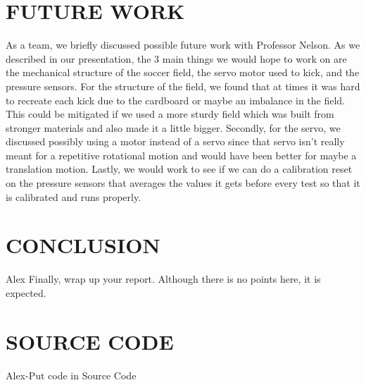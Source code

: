 \documentclass[12pt]{article}
\begin{document}
\section{FUTURE WORK}
As a team, we briefly discussed possible future work with Professor Nelson. As we described in our presentation, the 3 main things we would hope to work on are the mechanical structure of the soccer field, the servo motor used to kick, and the pressure sensors. For the structure of the field, we found that at times it was hard to recreate each kick due to the cardboard or maybe an imbalance in the field. This could be mitigated if we used a more sturdy field which was built from stronger materials and also made it a little bigger. Secondly, for the servo, we discussed possibly using a motor instead of a servo since that servo isn't really meant for a repetitive rotational motion and would have been better for maybe a translation motion. Lastly, we would work to see if we can do a calibration reset on the pressure sensors that averages the values it gets before every test so that it is calibrated and runs properly. 

\section{CONCLUSION}
Alex
Finally, wrap up your report. Although there is no points here, it is expected.

\newpage



\newpage
\appendix

\section{SOURCE CODE}
Alex-Put code in
Source Code

\end{document}
